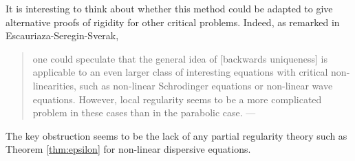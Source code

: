 \begin{remark}
	It is interesting to think about whether this method could be adapted to give alternative proofs of rigidity for other critical problems. Indeed, as remarked in Escauriaza-Seregin-Sverak,
	
\begin{quote}
	one could speculate that the general idea of [backwards uniqueness] is applicable to an even larger class of interesting equations with critical non-linearities, such as non-linear Schrodinger equations or non-linear wave equations. However, local regularity seems to be a more complicated problem in these cases than in the parabolic case. \hfill ---\cite{EscauriazaEtAl2003}
\end{quote}

The key obstruction seems to be the lack of any partial regularity theory such as Theorem \ref{thm:epsilon} for non-linear dispersive equations. 
\end{remark}
